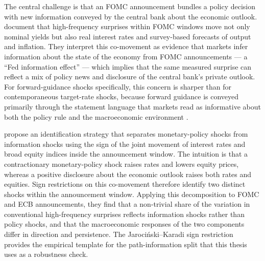 The central challenge is that an FOMC announcement bundles a policy
decision with new information conveyed by the central bank about the
economic outlook. \citet{nakamuraSteinsson2018} document that
high-frequency surprises within FOMC windows move not only nominal
yields but also real interest rates and survey-based forecasts of
output and inflation. They interpret this co-movement as evidence that
markets infer information about the state of the economy from FOMC
announcements --- a ``Fed information effect'' --- which implies that
the same measured surprise can reflect a mix of policy news and
disclosure of the central bank's private outlook. For forward-guidance
shocks specifically, this concern is sharper than for contemporaneous
target-rate shocks, because forward guidance is conveyed primarily
through the statement language that markets read as informative about
both the policy rule and the macroeconomic environment
\citep{cieslakSchrimpf2019,hansenMcMahonTong2019}.

\citet{jarocinskiKaradi2020} propose an identification strategy that
separates monetary-policy shocks from information shocks using the
sign of the joint movement of interest rates and broad equity indices
inside the announcement window. The intuition is that a contractionary
monetary-policy shock raises rates and lowers equity prices, whereas a
positive disclosure about the economic outlook raises both rates and
equities. Sign restrictions on this co-movement therefore identify
two distinct shocks within the announcement window. Applying this
decomposition to FOMC and ECB announcements, they find that a
non-trivial share of the variation in conventional high-frequency
surprises reflects information shocks rather than policy shocks, and
that the macroeconomic responses of the two components differ in
direction and persistence. The Jarociński--Karadi sign restriction
provides the empirical template for the path-information split that
this thesis uses as a robustness check.

